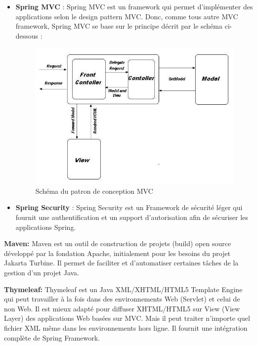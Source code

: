 \documentclass[12pt]{article}
\begin{document}
\begin{itemize}
	\item \textbf{Spring MVC} : Spring MVC est un framework qui permet d’implémenter des applications selon le design pattern MVC. Donc, comme tous autre MVC framework, Spring MVC se base sur le principe décrit par le schéma ci-dessous :\newline


\begin{figure}[H]
	\centering
 		\includegraphics[width=1\textwidth]{diagrammes/mvc.jpg}
  		\caption{Schéma du patron de conception MVC}
	\end{figure}

	\item \textbf{Spring Security }: Spring Security est un Framework de sécurité léger qui fournit une authentification et un support d’autorisation afin de sécuriser les applications Spring.\newline
\end{itemize}

\textbf{Maven:} Maven est un outil de construction de projets (build) open source développé par la fondation Apache, initialement pour les besoins du projet Jakarta Turbine. Il permet de faciliter et d'automatiser certaines tâches de la gestion d'un projet Java.\newline

\textbf{Thymeleaf:} Thymeleaf est un  Java XML/XHTML/HTML5 Template Engine qui peut travailler à la fois dans des environnements Web (Servlet) et celui de non Web. Il est mieux adapté pour diffuser XHTML/HTML5 sur View (View Layer) des applications Web basées sur MVC. Mais il peut traiter n'importe quel fichier XML même dans les environnements hors ligne. Il fournit une intégration complète de Spring Framework.
\end{document}
